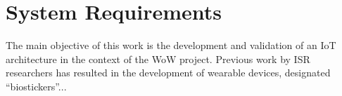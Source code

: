 
\section{System Requirements}

The main objective of this work is the development and validation of an \acs{IoT} architecture in the context of the \acs{WoW} project. Previous work by \acs{ISR} researchers has resulted in the development of wearable devices, designated ``biostickers''...







